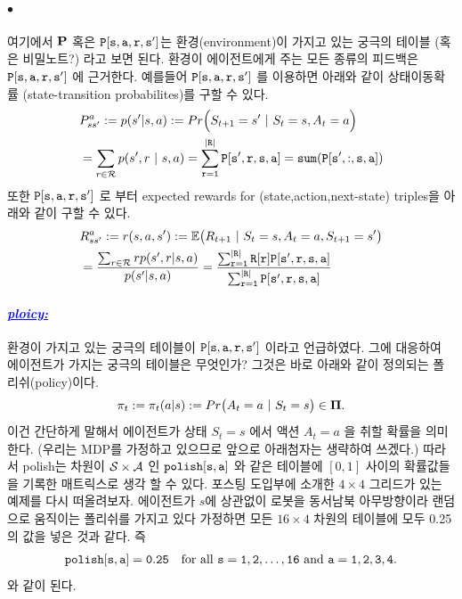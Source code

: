 \documentclass[12pt,oneside,english,a4paper]{article}
\def\ck{\paragraph{\Large$\bullet$}\Large}
\newcommand{\parablue}[1]{\paragraph{\Large\textcolor{blue}{\it\underline{\textbf{#1:}}}}\Large}
\newcommand{\bs}[1]{\mbox{\boldmath $#1$}}
\newcommand{\bfP}{\mbox{$\bf{P}$}}
\begin{document}
\ck 여기에서 $\bfP$ 혹은 ${\tt P[s,a,r,s']}$는 환경(environment)이 가지고 있는 궁극의 테이블 (혹은 비밀노트?) 라고 보면 된다. 환경이 에이전트에게 주는 모든 종류의 피드백은 ${\tt P[s,a,r,s']}$ 에 근거한다. 예를들어 ${\tt P[s,a,r,s']}$ 를 이용하면 아래와 같이 상태이동확률 (state-transition probabilites)를 구할 수 있다. 
\begin{align*}
&P_{ss'}^{a}:=p(s'|s,a):= Pr\Big(S_{t+1}=s'~|~S_t=s, A_t=a \Big) \\
&= \sum_{r \in {\cal R}}p(s',r~|~s,a) = \tt{\sum_{r=1}^{|R|}P[s',r,s,a]}={\tt sum(P[s',:,s,a])}
\end{align*}
또한 $\tt{P[s,a,r,s']}$ 로 부터 expected rewards for (state,action,next-state) triples을 아래와 같이 구할 수 있다. 
\begin{align*}
&R_{ss'}^{a}:=r(s,a,s'):=\mathbb{E}\big( R_{t+1} ~|~ S_t=s, A_t=a, S_{t+1}=s' \big) \\
& =\frac{\sum_{r \in {\cal R}}rp(s',r|s,a)}{p(s'|s,a)}
=\frac{\sum_{\tt r=1}^{\tt |R|}\tt{R[r]}P[s',r,s,a]}{ \tt{\sum_{r=1}^{|R|}P[s',r,s,a]}}
\end{align*}

\parablue{ploicy}  환경이 가지고 있는 궁극의 테이블이 ${\tt P[s,a,r,s']}$ 이라고 언급하였다. 그에 대응하여 에이전트가 가지는 궁극의 테이블은 무엇인가? 그것은 바로 아래와 같이 정의되는 폴리쉬(policy)이다. 
\begin{align*}
\pi_t:=\pi_t(a|s):=Pr\big(A_t=a ~ | ~ S_t=s\big) \in \bs{\Pi}.
\end{align*}
이건 간단하게 말해서 에이전트가 상태 $S_t=s$ 에서 액션 $A_t=a$ 을 취할 확률을 의미한다. (우리는 MDP를 가정하고 있으므로 앞으로 아래첨자는 생략하여 쓰겠다.) 따라서 polish는 차원이 ${\cal S} \times {\cal A}$ 인 $\tt{polish[s,a]}$ 와 같은 테이블에 $[0,1]$ 사이의 확률값들을 기록한 매트릭스로 생각 할 수 있다. 포스팅 도입부에 소개한 $4\times 4$ 그리드가 있는 예제를 다시 떠올려보자. 에이전트가 $s$에 상관없이 로봇을 동서남북 아무방향이라 랜덤으로 움직이는 폴리쉬를 가지고 있다 가정하면 모든 $16\times 4$ 차원의 테이블에 모두 0.25의 값을 넣은 것과 같다. 즉
\begin{align*}
{\tt polish[s,a] = 0.25} \quad \mbox{for all } {\tt s=1,2,\dots,16 } \mbox{ and } {\tt a=1,2,3,4.}
\end{align*}
와 같이 된다. 
\end{document}
